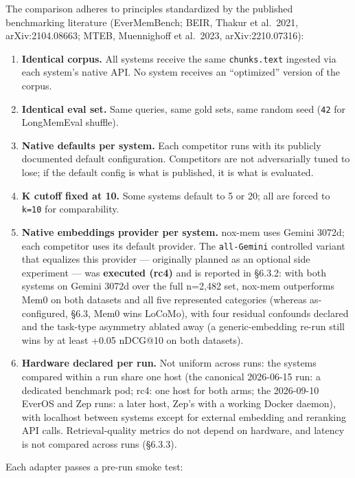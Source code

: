 \documentclass[
]{article}
\providecommand{\tightlist}{%
  \setlength{\itemsep}{0pt}\setlength{\parskip}{0pt}}
\begin{document}
The comparison adheres to principles standardized by the published
benchmarking literature (EverMemBench; BEIR, Thakur et al.~2021,
arXiv:2104.08663; MTEB, Muennighoff et al.~2023, arXiv:2210.07316):

\begin{enumerate}
\def\labelenumi{\arabic{enumi}.}
\tightlist
\item
  \textbf{Identical corpus.} All systems receive the same
  \texttt{chunks.text} ingested via each system's native API. No system
  receives an ``optimized'' version of the corpus.
\item
  \textbf{Identical eval set.} Same queries, same gold sets, same random
  seed (\texttt{42} for LongMemEval shuffle).
\item
  \textbf{Native defaults per system.} Each competitor runs with its
  publicly documented default configuration. Competitors are not
  adversarially tuned to lose; if the default config is what is
  published, it is what is evaluated.
\item
  \textbf{K cutoff fixed at 10.} Some systems default to 5 or 20; all
  are forced to \texttt{k=10} for comparability.
\item
  \textbf{Native embeddings provider per system.} nox-mem uses Gemini
  3072d; each competitor uses its default provider. The
  \texttt{all-Gemini} controlled variant that equalizes this provider
  --- originally planned as an optional side experiment --- was
  \textbf{executed (rc4)} and is reported in §6.3.2: with both systems
  on Gemini 3072d over the full n=2,482 set, nox-mem outperforms Mem0 on
  both datasets and all five represented categories (whereas
  as-configured, §6.3, Mem0 wins LoCoMo), with four residual confounds
  declared and the task-type asymmetry ablated away (a generic-embedding
  re-run still wins by at least +0.05 nDCG@10 on both datasets).
\item
  \textbf{Hardware declared per run.} Not uniform across runs: the
  systems compared within a run share one host (the canonical 2026-06-15
  run: a dedicated benchmark pod; rc4: one host for both arms; the
  2026-09-10 EverOS and Zep runs: a later host, Zep's with a working
  Docker daemon), with localhost between systems except for external
  embedding and reranking API calls. Retrieval-quality metrics do not
  depend on hardware, and latency is not compared across runs (§6.3.3).
\end{enumerate}

Each adapter passes a pre-run smoke test:
\end{document}
